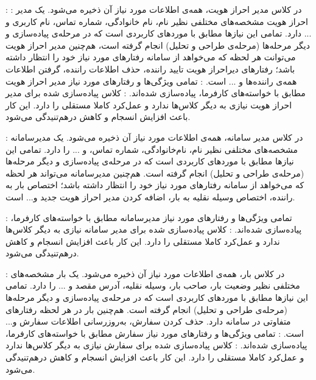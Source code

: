 	\newpage
	 :
		  : در کلاس مدیر احراز هویت، همه‌ی اطلاعات مورد نیاز آن ذخیره می‌شود. یک مدیر احراز هویت مشخصه‌های مختلفی نظیر نام، نام خانوادگی، شماره تماس، نام کاربری و ... دارد. تمامی این نیاز‌ها مطابق با موردهای کاربردی است که در مرحله‌ی پیاده‌سازی و دیگر مرحله‌ها (مرحله‌ی طراحی و تحلیل) انجام گرفته است، هم‌چنین مدیر احراز هویت می‌توانت هر لحظه که می‌خواهد از سامانه رفتارهای مورد نیاز خود را انتظار داشته باشد؛ رفتارهای دیراحراز هویت تایید راننده، حذف اطلاعات راننده، گرفتن اطلاعات همه‌ی راننده‌ها و ... است.
		 : تمامی ویژگی‌ها و رفتارهای مورد نیاز مدیر احراز هویت مطابق با خواسته‌های کارفرما، پیاده‌سازی شده‌اند.
		 : کلاس‌ پیاده‌سازی شده برای مدیر احراز هویت نیازی به دیگر کلاس‌ها ندارد و عمل‌کرد کاملا مستقلی را دارد. این کار باعث افزایش انسجام و کاهش درهم‌تنیدگی می‌شود.
		
	\newpage
	 
	
		  : در کلاس مدیر سامانه، همه‌ی اطلاعات مورد نیاز آن ذخیره می‌شود. یک مدیرسامانه مشخصه‌های مختلفی نظیر نام، نام‌خانوادگی، شماره تماس، و ... را دارد. تمامی این نیازها مطابق با موردهای کاربردی است که در  مرحله‌ی پیاده‌سازی و دیگر مرحله‌ها (مرحله‌ی طراحی و تحلیل) انجام گرفته است. هم‌چنین مدیرسامانه می‌تواند هر لحظه که می‌خواهد از سامانه رفتارهای مورد نیاز خود را انتظار داشته باشد؛ اختصاص بار به راننده، اختصاص وسیله نقلیه به بار، اضافه کردن مدیر احراز هویت جدید و... است.
		
		 : تمامی ویژگی‌ها و رفتارهای مورد نیاز  مدیرسامانه مطابق با خواسته‌های کارفرما، پیاده‌سازی شده‌اند.
		 : کلاس‌ پیاده‌سازی شده برای مدیر سامانه نیازی به دیگر کلاس‌ها ندارد و عمل‌کرد کاملا مستقلی را دارد. این کار باعث افزایش انسجام و کاهش درهم‌تنیدگی می‌شود.
	\newpage
	 

		  : در کلاس بار، همه‌ی اطلاعات مورد نیاز آن ذخیره می‌شود. یک بار مشخصه‌های مختلفی نظیر وضعیت بار، صاحب بار، وسیله نقلیه، آدرس مقصد  و ... را دارد. تمامی این نیازها مطابق با موردهای کاربردی است که در  مرحله‌ی پیاده‌سازی و دیگر مرحله‌ها (مرحله‌ی طراحی و تحلیل) انجام گرفته است. هم‌چنین بار در هر لحظه رفتارهای متفاوتی در سامانه دارد. حذف کردن سفارش، به‌روزرسانی اطلاعات سفارش  و... است.
		 : تمامی ویژگی‌ها و رفتارهای مورد نیاز  سفارش مطابق با خواسته‌های کارفرما، پیاده‌سازی شده‌اند.
		 : کلاس‌ پیاده‌سازی شده برای سفارش نیازی به دیگر کلاس‌ها ندارد و عمل‌کرد کاملا مستقلی را دارد. این کار باعث افزایش انسجام و کاهش درهم‌تنیدگی می‌شود.
	\newpage
	 
	

